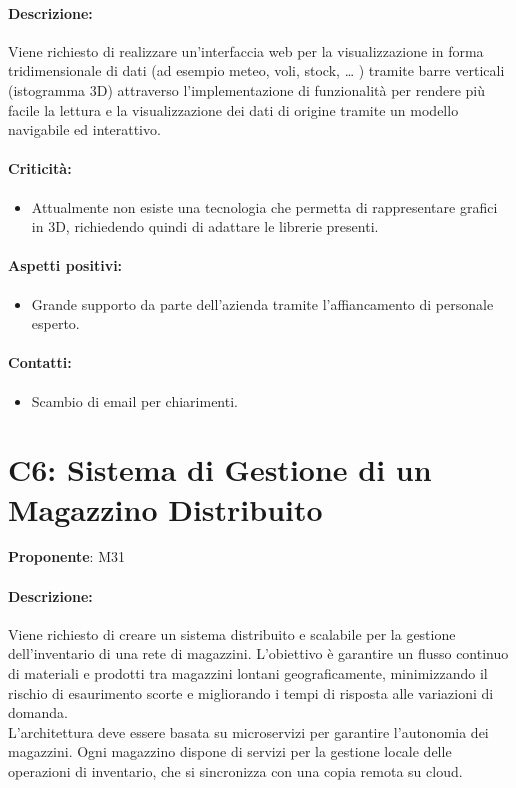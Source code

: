 \documentclass{TWDocumentFull}
\begin{document}
    \paragraph{Descrizione:\\}
    {Viene richiesto di realizzare un'interfaccia web per la visualizzazione in forma tridimensionale di dati (ad esempio meteo, voli, stock, … ) tramite barre verticali (istogramma 3D) attraverso l'implementazione di funzionalità per rendere più facile la lettura e la visualizzazione dei dati di origine tramite un modello navigabile ed interattivo.}
    \paragraph{Criticità:}
    \begin{itemize}
        \item Attualmente non esiste una tecnologia che permetta di rappresentare grafici in 3D, richiedendo quindi di adattare le librerie presenti.
    \end{itemize}
    \paragraph{Aspetti positivi:}
    \begin{itemize}
        \item Grande supporto da parte dell'azienda tramite l'affiancamento di personale esperto.
    \end{itemize}
    \paragraph{Contatti:}
    \begin{itemize}
        \item Scambio di email per chiarimenti.
    \end{itemize}

    \section*{C6: Sistema di Gestione di un Magazzino Distribuito}
    {\textbf{Proponente}: M31}
    \paragraph{Descrizione:\\}
    {Viene richiesto di creare un sistema distribuito e scalabile per la gestione dell'inventario di una rete di magazzini. L'obiettivo è garantire un flusso continuo di materiali e prodotti tra magazzini lontani geograficamente, minimizzando il rischio di esaurimento scorte e migliorando i tempi di risposta alle variazioni di domanda. \\L'architettura deve essere basata su microservizi per garantire l'autonomia dei magazzini. Ogni magazzino dispone di servizi per la gestione locale delle operazioni di inventario, che si sincronizza con una copia remota su cloud.
}
\end{document}
